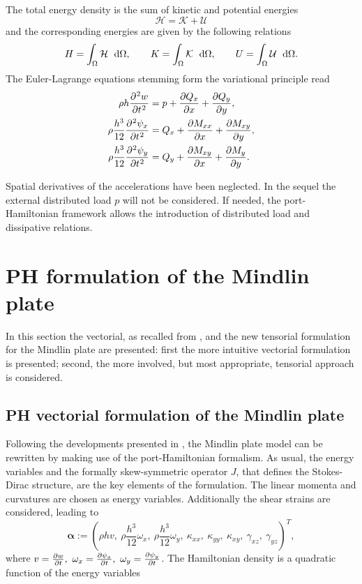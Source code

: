 \documentclass[preprint,12pt]{elsarticle}
\begin{document}
The total energy density is the sum of kinetic and potential energies
\begin{equation}
\mathcal{H} = \mathcal{K} + \mathcal{U}
\end{equation}
and the corresponding energies are given by the following relations
\begin{equation}
H = \int_{\Omega} \mathcal{H} \ \d\Omega, \qquad K = \int_{\Omega} \mathcal{K} \ \d\Omega, \qquad U = \int_{\Omega} \mathcal{U} \ \d\Omega.
\end{equation}
The Euler-Lagrange equations stemming form the variational principle read\begin{equation}
\begin{aligned}
\rho h \diffp[2]{w}{t} &= p + \diffp{Q_x}{x} + \diffp{Q_y}{y}, \\
\rho\frac{h^3}{12} \diffp[2]{\psi_x}{t} &= Q_x + \diffp{M_{xx}}{x} + \diffp{M_{xy}}{y}, \\
\rho\frac{h^3}{12} \diffp[2]{\psi_y}{t} &= Q_y + \diffp{M_{xy}}{x} + \diffp{M_{y}}{y}. \\
\end{aligned}
\end{equation}

Spatial derivatives of the accelerations have been neglected. In the sequel the external distributed load $p$ will not be considered. If needed, the port-Hamiltonian framework allows the introduction of distributed load and dissipative relations.

\section{PH formulation of the Mindlin plate}
In this section the vectorial, as recalled from \cite{MacchelliMindlin},  and the new tensorial formulation for the Mindlin plate are presented: first the more intuitive vectorial formulation is presented; second, the more involved, but most appropriate, tensorial approach is considered. 


\subsection{PH vectorial formulation of the Mindlin plate}
\label{sec:PH_vec_Min}
Following the developments presented in \cite{MacchelliMindlin}, the Mindlin plate model can be rewritten by making use of the port-Hamiltonian formalism. As usual, the energy variables and the formally skew-symmetric operator $J$, that defines the Stokes-Dirac structure, are the key elements of the formulation. The linear momenta and curvatures are chosen as energy variables. Additionally the shear strains are considered, leading to \begin{equation}
\bm{\alpha} := \left(\rho h v,\ \rho \frac{h^3}{12} \omega_x,\ \rho \frac{h^3}{12} \omega_y,\ \kappa_{xx},\ \kappa_{yy},\ \kappa_{xy},\ \gamma_{xz},\ \gamma_{yz} \right)^T,
\end{equation}
where $v = \diffp{w}{t},\ \omega_x = \diffp{\psi_x}{t},\ \omega_y = \diffp{\psi_y}{t}$. The Hamiltonian density is a quadratic function of the energy variables 
\end{document}
